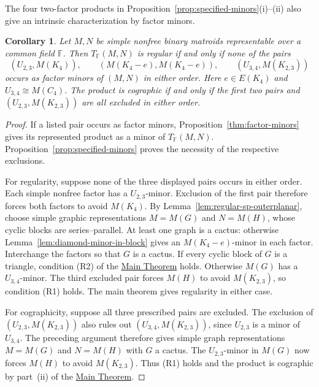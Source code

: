 \documentclass[12pt,a4paper]{article}
\numberwithin{equation}{section}
\newcommand{\F}{\mathbb F}
\newcommand{\mainthm}{\hyperref[thm:regular-two-factor]{Main Theorem}}
\newtheorem{corollary}[corollary]{Corollary}
\theoremstyle{definition}
\theoremstyle{remark}
\begin{document}
The four two-factor products in
Proposition~\ref{prop:specified-minors}\textup{(i)--(ii)} also give
an intrinsic characterization by factor minors.
\begin{corollary}\label{cor:regular-forbidden-pairs}
Let \(M,N\) be simple nonfree binary matroids representable over
a common field \(\F\).  Then \(T_{\F}(M,N)\) is regular if and only if none of the pairs
\[
 (U_{2,3},M(K_4)),\qquad
 (M(K_4-e),M(K_4-e)),\qquad
 (U_{3,4},M(K_{2,3}))
\]
occurs as factor minors of \((M,N)\) in either order.
Here \(e\in E(K_4)\) and \(U_{3,4}\cong M(C_4)\).
The product is cographic if and only if the first two pairs and
\((U_{2,3},M(K_{2,3}))\) are all excluded in either order.
\end{corollary}
\begin{proof}
If a listed pair occurs as factor minors, Proposition~\ref{thm:factor-minors}
gives its represented product as a minor of \(T_{\F}(M,N)\).
Proposition~\ref{prop:specified-minors} proves the necessity of the
respective exclusions.

For regularity, suppose none of the three displayed pairs occurs in either order.  Each simple nonfree factor has a
\(U_{2,3}\)-minor.  Exclusion of the first pair therefore forces
both factors to avoid \(M(K_4)\).  By
Lemma~\ref{lem:regular-sp-outerplanar}, choose simple graphic
representations \(M=M(G)\) and \(N=M(H)\), whose cyclic blocks
are series--parallel.  At least one graph is a cactus: otherwise
Lemma~\ref{lem:diamond-minor-in-block} gives an \(M(K_4-e)\)-minor
in each factor.  Interchange the factors so that \(G\) is a cactus.
If every cyclic block of \(G\) is a triangle, condition
\textup{(R2)} of the \mainthm{} holds.
Otherwise \(M(G)\) has a \(U_{3,4}\)-minor.  The third excluded
pair forces \(M(H)\) to avoid \(M(K_{2,3})\), so condition
\textup{(R1)} holds.  The main theorem gives regularity in either case.

For cographicity, suppose all three prescribed pairs are excluded.
The exclusion of \((U_{2,3},M(K_{2,3}))\) also rules out
\((U_{3,4},M(K_{2,3}))\), since \(U_{2,3}\) is a minor of
\(U_{3,4}\).  The preceding argument therefore gives simple graph
representations \(M=M(G)\) and \(N=M(H)\) with \(G\) a cactus.
The \(U_{2,3}\)-minor in \(M(G)\) now forces \(M(H)\) to avoid
\(M(K_{2,3})\).
Thus \textup{(R1)} holds and the product is cographic by
part~\textup{(ii)} of the \mainthm{}.
\end{proof}
\end{document}
